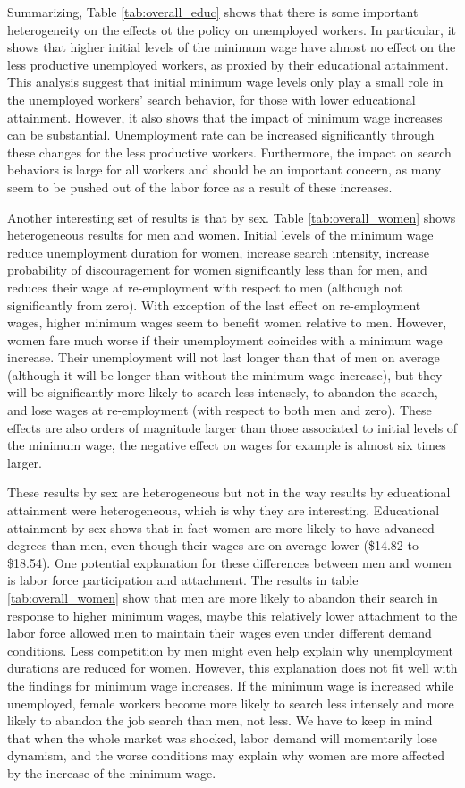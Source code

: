 \documentclass{article}
\begin{document}
Summarizing, Table \ref{tab:overall_educ} shows that there is some important heterogeneity on the effects ot the policy on unemployed workers. In particular, it shows that higher initial levels of the minimum wage have almost no effect on the less productive unemployed workers, as proxied by their educational attainment. This analysis suggest that initial minimum wage levels only play a small role in the unemployed workers' search behavior, for those with lower educational attainment. However, it also shows that the impact of minimum wage increases can be substantial. Unemployment rate can be increased significantly through these changes for the less productive workers. Furthermore, the impact on search behaviors is large for all workers and should be an important concern, as many seem to be pushed out of the labor force as a result of these increases.

Another interesting set of results is that by sex. Table \ref{tab:overall_women} shows heterogeneous results for men and women. Initial levels of the minimum wage reduce unemployment duration for women, increase search intensity, increase probability of discouragement for women significantly less than for men, and reduces their wage at re-employment with respect to men (although not significantly from zero). With exception of the last effect on re-employment wages, higher minimum wages seem to benefit women relative to men. However, women fare much worse if their unemployment coincides with a minimum wage increase. Their unemployment will not last longer than that of men on average (although it will be longer than without the minimum wage increase), but they will be significantly more likely to search less intensely, to abandon the search, and lose wages at re-employment (with respect to both men and zero). These effects are also orders of magnitude larger than those associated to initial levels of the minimum wage, the negative effect on wages for example is almost six times larger.

These results by sex are heterogeneous but not in the way results by educational attainment were heterogeneous, which is why they are interesting. Educational attainment by sex shows that in fact women are more likely to have advanced degrees than men, even though their wages are on average lower (\$14.82 to \$18.54). One potential explanation for these differences between men and women is labor force participation and attachment. The results in table \ref{tab:overall_women} show that men are more likely to abandon their search in response to higher minimum wages, maybe this relatively lower attachment to the labor force allowed men to maintain their wages even under different demand conditions. Less competition by men might even help explain why unemployment durations are reduced for women. However, this explanation does not fit well with the findings for minimum wage increases. If the minimum wage is increased while unemployed, female workers become more likely to search less intensely and more likely to abandon the job search than men, not less. We have to keep in mind that when the whole market was shocked, labor demand will momentarily lose dynamism, and the worse conditions may explain why women are more affected by the increase of the minimum wage.
\end{document}
